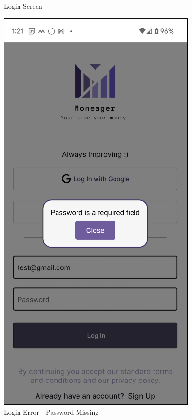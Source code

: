 \begin{figure}[htbp]
\begin{minipage}[t]{0.35\textwidth}
        \caption{Login Screen}
        \label{fig:login}
    \end{minipage}
    \hfill
    \begin{minipage}[t]{0.35\textwidth}
        \centering
        \includegraphics[width=\textwidth]{Screen Shots/Moneager/ScreenShotLoginErrorPasswordMissing.png}
        \caption{Login Error - Password Missing}
        \label{fig:login-error}
    \end{minipage}
\end{figure}

